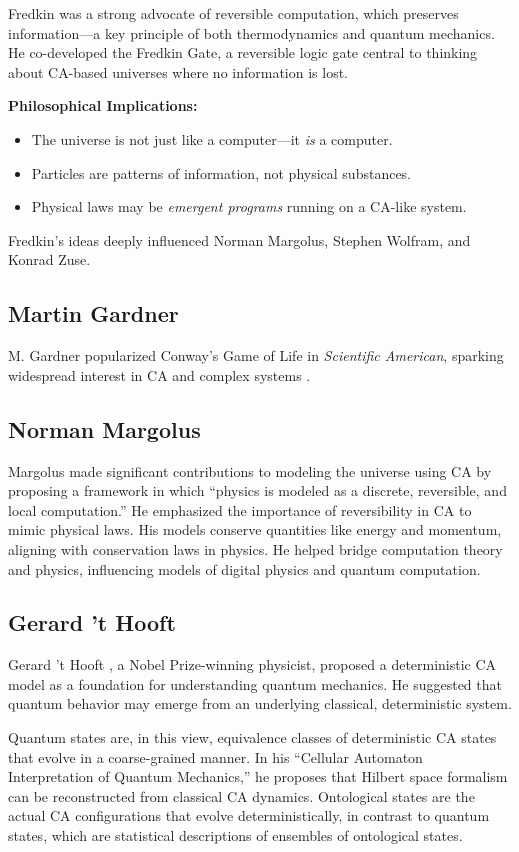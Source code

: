 \documentclass[12pt,english]{article}
\begin{document}
Fredkin was a strong advocate of reversible computation, which preserves information—a key principle of both thermodynamics and quantum mechanics. He co-developed the Fredkin Gate, a reversible logic gate central to thinking about CA-based universes where no information is lost.

\textbf{Philosophical Implications:}
\begin{itemize}
  \item The universe is not just like a computer—it \emph{is} a computer.
  \item Particles are patterns of information, not physical substances.
  \item Physical laws may be \emph{emergent programs} running on a CA-like system.
\end{itemize}

Fredkin’s ideas deeply influenced Norman Margolus, Stephen Wolfram, and Konrad Zuse.

\subsection*{Martin Gardner}
M. Gardner popularized Conway’s Game of Life in \emph{Scientific American}, sparking widespread interest in CA and complex systems \cite{gardner1970}.

\subsection*{Norman Margolus}
Margolus \cite{margolus} made significant contributions to modeling the universe using CA by proposing a framework in which ``physics is modeled as a discrete, reversible, and local computation.'' He emphasized the importance of reversibility in CA to mimic physical laws. His models conserve quantities like energy and momentum, aligning with conservation laws in physics. He helped bridge computation theory and physics, influencing models of digital physics and quantum computation.

\subsection*{Gerard 't Hooft}
Gerard 't Hooft \cite{thooft}, a Nobel Prize-winning physicist, proposed a deterministic CA model as a foundation for understanding quantum mechanics. He suggested that quantum behavior may emerge from an underlying classical, deterministic system.

Quantum states are, in this view, equivalence classes of deterministic CA states that evolve in a coarse-grained manner. In his ``Cellular Automaton Interpretation of Quantum Mechanics,'' he proposes that Hilbert space formalism can be reconstructed from classical CA dynamics. Ontological states are the actual CA configurations that evolve deterministically, in contrast to quantum states, which are statistical descriptions of ensembles of ontological states.
\end{document}
